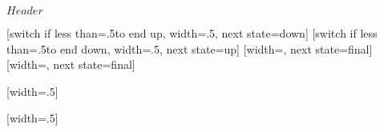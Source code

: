 \ProvidesPackageRCS[v\pgfversion] $Header$

%


\newdimen\pgfsnakewaveamplitude
\newdimen\pgfsnakewavelength
\pgfsnakewavelength=10pt
\pgfsnakewaveamplitude=2.5pt


%

{
  [switch if less than=.5\pgfsnakewavelength to end up,%
             width=.5\pgfsnakewavelength,%
             next state=down]
  {
    \pgfpathlineto{\pgfpoint{.25\pgfsnakewavelength}{\pgfsnakewaveamplitude}}
    \pgfpathlineto{\pgfpoint{.5\pgfsnakewavelength}{0pt}}
  }
  [switch if less than=.5\pgfsnakewavelength to end down,%
               width=.5\pgfsnakewavelength,%
               next state=up]
  {
    \pgfpathlineto{\pgfpoint{.25\pgfsnakewavelength}{-\pgfsnakewaveamplitude}}
    \pgfpathlineto{\pgfpoint{.5\pgfsnakewavelength}{0pt}}
  }
  [width=\pgfsnakeremainingdistance,
                 next state=final]
  {
    \pgfpathlineto{\pgfpoint{.5\pgfsnakeremainingdistance}{.5\pgfsnakeremainingdistance}}
    \pgfpathlineto{\pgfpoint{\pgfsnakeremainingdistance}{0pt}}
  }
  [width=\pgfsnakeremainingdistance,
                   next state=final]
  {
    \pgfpathlineto{\pgfpoint{.5\pgfsnakeremainingdistance}{-.5\pgfsnakeremainingdistance}}
    \pgfpathlineto{\pgfpoint{\pgfsnakeremainingdistance}{0pt}}
  }
}



%

{
  [width=.5\pgfsnakewavelength]
  {
    \pgfpathlineto{\pgfpoint{.5\pgfsnakewavelength}{2\pgfsnakewaveamplitude}}
    \pgfpathlineto{\pgfpoint{.5\pgfsnakewavelength}{0pt}}
  }
  {
    \pgfpathlineto{\pgfpoint{\pgfsnakeremainingdistance}{0pt}}
  }
}



%

{
  [width=.5\pgfsnakewavelength]
  {
    \pgfpathcurveto
    {\pgfpoint{0pt}{.555\pgfsnakewaveamplitude}}
    {\pgfpoint{0.11125\pgfsnakewavelength}{\pgfsnakewaveamplitude}}
    {\pgfpoint{.25\pgfsnakewavelength}{\pgfsnakewaveamplitude}}
    \pgfpathcurveto
    {\pgfpoint{.38875\pgfsnakewavelength}{\pgfsnakewaveamplitude}}
    {\pgfpoint{.5\pgfsnakewavelength}{.5\pgfsnakewaveamplitude}}
    {\pgfpoint{.5\pgfsnakewavelength}{0\pgfsnakewaveamplitude}}
  }
  {
    \pgfpathlineto{\pgfpoint{\pgfsnakeremainingdistance}{0pt}}
  }
}



